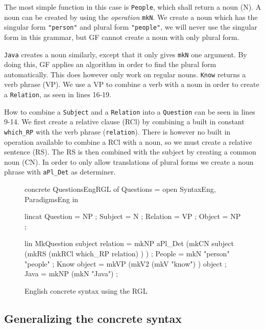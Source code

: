 The most simple function in this case is \texttt{People}, which shall return a noun (N). A noun can be created by using the \emph{operation} \texttt{mkN}. We create a noun which has the singular form \texttt{"person"} and plural form \texttt{"people"}, we will never use the singular form in this grammar, but GF cannot create a noun with only plural form. 

\texttt{Java} creates a noun similarly, except that it only gives \texttt{mkN} one argument. By doing this, GF applies an algorithm in order to find the plural form automatically. This does however only work on regular nouns. \texttt{Know} returns a verb phrase (VP). We use a VP to combine a verb with a noun in order to create a \texttt{Relation}, as seen in lines 16-19. 

How to combine a \texttt{Subject} and a \texttt{Relation} into a \texttt{Question} can be seen in lines 9-14. We first create a relative clause (RCl) by combining a built in constant \texttt{which\_RP} with the verb phrase (\texttt{relation}). There is however no built in operation available to combine a RCl with a noun, so we must create a relative sentence (RS). The RS is then combined with the subject by creating a common noun (CN). In order to only allow translations of plural forms we create a noun phrase with \texttt{aPl\_Det} as determiner.

\begin{figure}[h]
\begin{code}
concrete QuestionsEngRGL of Questions = open SyntaxEng, ParadigmsEng in {
  lincat
    Question = NP ;
    Subject = N ;
    Relation = VP ;
    Object = NP ;

  lin
    MkQuestion subject relation = mkNP aPl_Det 
                                        (mkCN subject 
                                            (mkRS 
                                                (mkRCl which_RP relation)
                                            )
                                        ) ;
    People = mkN "person" "people" ;
    Know object = mkVP 
                    (mkV2 
                        (mkV "know")
                    ) object ;
    Java = mkNP (mkN "Java") ;
}
\end{code}
\caption{English concrete syntax using the RGL}
\end{figure}

\subsection{Generalizing the concrete syntax}

